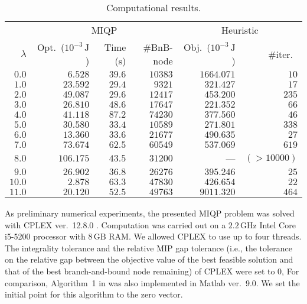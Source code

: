 \documentclass[a4paper,11pt]{scrartcl}
\theoremstyle{plain}
\theoremstyle{definition}
\theoremstyle{remark}
\begin{document}
\begin{table}[bp]
  \centering
  \caption{Computational results.}
  \label{tab:result}
  \begin{tabular}{rrrrrr}
    \toprule
    & \multicolumn{3}{c}{MIQP} & \multicolumn{2}{c}{Heuristic \cite{KO16}} \\
    \cmidrule(lr){2-4}  \cmidrule(l){5-6}
    $\lambda$ & Opt.\ ($10^{-3}\,\mathrm{J}$) & Time (s) & {\#}BnB-node 
    & Obj.\ ($10^{-3}\,\mathrm{J}$) & {\#}iter.\ \\
    \midrule
    $0.0$  &  $6.528$ & $39.6$ & $10383$ & $1664.071$ & $10$ \\
    $1.0$  & $23.592$ & $29.4$ & $9321$  & $321.427$ & $17$ \\
    $2.0$  & $49.087$ & $29.6$ & $12417$ & $453.200$ & $235$ \\
    $3.0$  & $26.810$ & $48.6$ & $17647$ & $221.352$ & $66$ \\
    $4.0$  & $41.118$ & $87.2$ & $74230$ & $377.560$ & $46$ \\
    $5.0$  & $30.580$ & $33.4$ & $10589$ & $271.801$ & $338$ \\
    $6.0$  & $13.360$ & $33.6$ & $21677$ & $490.635$ & $27$ \\
    $7.0$  & $73.674$ & $62.5$ & $60549$ & $537.069$ & $619$ \\
    $8.0$  & $106.175$ & $43.5$ & $31200$ & --- & $(>10000)$ \\
    $9.0$  & $26.902$ & $36.8$ & $26276$ & $395.246$ & $25$ \\
    $10.0$ & $2.878$ & $63.3$ & $47830$  & $426.654$ & $22$ \\
    $11.0$ & $20.120$ & $52.5$ & $49763$ & $9011.320$ & $464$ \\
    \bottomrule
  \end{tabular}
\end{table}

As preliminary numerical experiments, the presented MIQP problem was 
solved with CPLEX ver.~12.8.0 \cite{cplex}. 
Computation was carried out on a $2.2\,\mathrm{GHz}$ Intel Core i5-5200 
processor with $8\,\mathrm{GB}$ RAM. 
We allowed CPLEX to use up to four threads. 
The integrality tolerance and 
the relative MIP gap tolerance (i.e., the tolerance on the relative gap 
between the objective value of the best feasible solution and that of 
the best branch-and-bound node remaining) of CPLEX were set to $0$, 
For comparison, Algorithm~1 in \cite{KO16} was also implemented 
in Matlab ver.\ 9.0. 
We set the initial point for this algorithm to the zero vector. 
\end{document}
